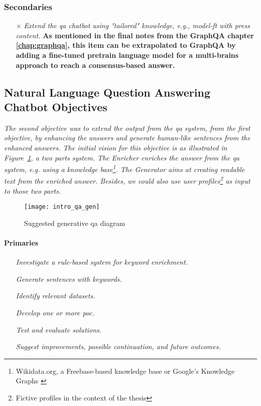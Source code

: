 \subsubsection{Secondaries}
\begin{itemize}[noitemsep]
    \item[$\times$] \textit{Extend the \gls{qa} chatbot using "tailored" knowledge, e.g., \gls{model-ft} with press content.} \textbf{As mentioned in the final notes from the GraphQA chapter \ref{chap:graphqa}, this item can be extrapolated to GraphQA by adding a fine-tuned pretrain language model for a multi-brains approach to reach a consensus-based answer.}
\end{itemize}

\subsection{Natural Language Question Answering Chatbot Objectives}
\textit{The second objective was to extend the output from the \gls{qa} system, from the first objective, by enhancing the answers and generate human-like sentences from the enhanced answers. The initial vision for this objective is as illustrated in Figure~\ref{fig:planning_qa_gen}, a two parts system. The \textit{Enricher} enriches the answer from the \gls{qa} system, e.g. using a knowledge base\footnote{Wikidata.org, a Freebase-based  \autocite{paper:bollacker2008} knowledge base or Google's Knowledge Graphs \autocite{blog:intro_knowledge_graph}}. The \textit{Generator} aims at creating readable text from the enriched answer. Besides, we could also use user profiles\footnote{Fictive profiles in the context of the thesis} as input to those two parts.}

\begin{figure}[ht!]
    \centering
    \texttt{[image: intro\_qa\_gen]}
    \caption{Suggested \gls{generative} \gls{qa} diagram}
    \label{fig:planning_qa_gen}
\end{figure}


\paragraph{Primaries}
\begin{itemize}[noitemsep]
    \item[\checkmark] \textit{Investigate a rule-based system for keyword enrichment.}
    \item[\checkmark] \textit{Generate sentences with keywords.}
    \item[\checkmark] \textit{Identify relevant datasets.}
    \item[\checkmark] \textit{Develop one or more \gls{poc}.}
    \item[\checkmark] \textit{Test and evaluate solutions.}
    \item[\checkmark] \textit{Suggest improvements, possible continuation, and future outcomes.}
\end{itemize}

